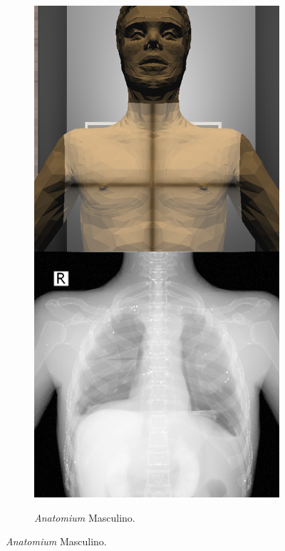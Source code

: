 \begin{figure}[ht]
\begin{subfigure}[b]{0.24\linewidth}
    \end{subfigure}
     \begin{subfigure}[b]{0.24\linewidth}
        \centering
        {\includegraphics[width=\linewidth]{IMG/anaex.png}}
        \caption{\emph{Anatomium} Masculino.}

\end{subfigure}
\end{figure}

